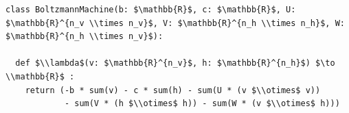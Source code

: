 \documentclass[border=10pt]{standalone}
\begin{document}
\begin{lstlisting}
class BoltzmannMachine(b: $\mathbb{R}$, c: $\mathbb{R}$, U: $\mathbb{R}^{n_v \\times n_v}$, V: $\mathbb{R}^{n_h \\times n_h}$, W: $\mathbb{R}^{n_h \\times n_v}$):

  def $\\lambda$(v: $\mathbb{R}^{n_v}$, h: $\mathbb{R}^{n_h}$) $\to \\mathbb{R}$ :
    return (-b * sum(v) - c * sum(h) - sum(U * (v $\\otimes$ v)) 
            - sum(V * (h $\\otimes$ h)) - sum(W * (v $\\otimes$ h)))
\end{lstlisting}
\end{document}
